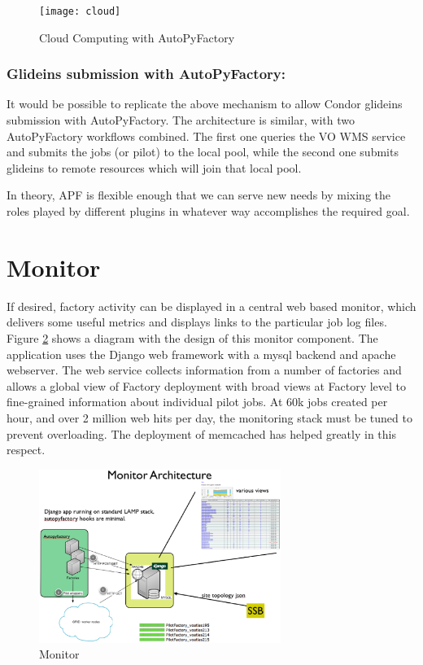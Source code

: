 \documentclass[a4paper]{jpconf}
\begin{document}
\begin{figure}[h]
\centering\texttt{[image: cloud]}
\caption{Cloud Computing with AutoPyFactory}
\label{cloud}
\end{figure}

\subsubsection{Glideins submission with AutoPyFactory:}
It would be possible to replicate the above mechanism to allow Condor glideins submission with AutoPyFactory.
The architecture is similar, with two AutoPyFactory workflows combined.
The first one queries the VO WMS service and submits the jobs (or pilot) to the local pool, 
while the second one submits glideins to remote resources which will join that local pool. 

In theory, APF is flexible enough that we can serve new needs by mixing the
roles played by different plugins in whatever way accomplishes the required
goal. 

\section{Monitor}

If desired, factory activity can be displayed in a central web based monitor,
which delivers some useful metrics and displays links to the particular job log
files. Figure \ref{monitor} shows a diagram with the design of this monitor component.
The application uses the Django web framework with a mysql backend and apache webserver. 
The web service collects information from a number of
factories and allows a global view of Factory deployment with broad
views at Factory level to fine-grained information about individual pilot jobs. 
At 60k jobs created per hour, and over 2 million web hits per day, 
the monitoring stack must be tuned to prevent overloading.
The deployment of memcached has helped greatly in this respect.


\begin{figure}[h]
\centering\includegraphics[width=0.7\textwidth]{monitor}
\caption{Monitor}
\label{monitor}
\end{figure}
\end{document}
